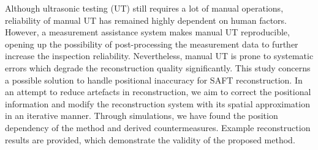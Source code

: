 Although ultrasonic testing (UT) still requires a lot of manual operations, reliability of manual UT has remained highly dependent on human factors. However, a measurement assistance system makes manual UT reproducible, opening up the possibility of post-processing the measurement data to further increase the inspection reliability. Nevertheless, manual UT is prone to systematic errors which degrade the reconstruction quality significantly. %
This study concerns a possible solution to handle positional inaccuracy for SAFT reconstruction. In an attempt to reduce artefacts in reconstruction, we aim to correct the positional information and modify the reconstruction system with its spatial approximation in an iterative manner. Through simulations, we have found the position dependency of the method and derived countermeasures. Example reconstruction results are provided, which demonstrate the validity of the proposed method.
%
